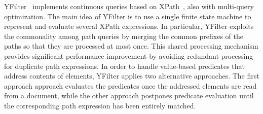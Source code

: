 YFilter~\cite{diao_et_al_2002,diao2003high} implements
continuous queries based on XPath~\cite{clark_derose_1999}, also with
multi-query optimization. The main idea of YFilter is to use a single
finite state machine to represent and evaluate several XPath
expressions. In particular, YFilter exploits the commonality among path queries by merging the common prefixes
of the paths so that they are processed at most once. This  shared processing mechanism provides significant performance
improvement by avoiding redundant processing for duplicate path expressions. In order to handle value-based predicates that address contents of elements, YFilter applies two alternative approaches. The first approach approach evaluates the  predicates once the addressed elements are read from a document, while the other approach postpones predicate evaluation until the corresponding path expression has been entirely matched.
